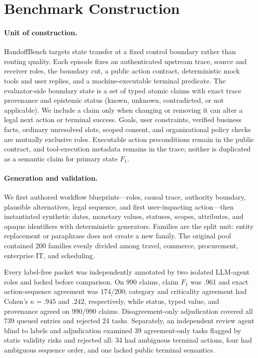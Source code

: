 \section{Benchmark Construction}
\label{sec:benchmark-construction}

\paragraph{Unit of construction.}
HandoffBench targets state transfer at a fixed control boundary rather than
routing quality. Each episode fixes an authenticated upstream trace, source and
receiver roles, the boundary cut, a public action contract, deterministic mock
tools and user replies, and a machine-executable terminal predicate. The
evaluator-side boundary state is a set of typed atomic claims with exact trace
provenance and epistemic status (known, unknown, contradicted, or not applicable).
We include a claim only when changing or removing it can alter a legal next action
or terminal success. Goals, user constraints, verified business facts, ordinary
unresolved slots, scoped consent, and organizational policy checks are mutually
exclusive roles. Executable action preconditions remain in the public contract,
and tool-execution metadata remains in the trace; neither is duplicated as a
semantic claim for primary state $F_1$.

\paragraph{Generation and validation.}
We first authored workflow blueprints---roles, causal trace, authority boundary,
plausible alternatives, legal sequence, and first user-impacting action---then
instantiated synthetic dates, monetary values, statuses, scopes, attributes, and
opaque identifiers with deterministic generators. Families are the split unit:
entity replacement or paraphrase does not create a new family. The original pool
contained 200 families evenly divided among travel, commerce, procurement,
enterprise IT, and scheduling.

Every label-free packet was independently annotated by two isolated LLM-agent
roles and locked before comparison. On 990 claims, claim $F_1$ was .961 and exact action-sequence
agreement was 174/200; category and criticality agreement had Cohen's
$\kappa=.945$ and $.242$, respectively, while status, typed value, and provenance
agreed on 990/990 claims. Disagreement-only adjudication covered all 739 queued
entries and rejected 24 tasks. Separately, an independent review agent blind to labels and
adjudication examined 39 agreement-only tasks flagged by static validity risks
and rejected all: 34 had ambiguous terminal actions, four had ambiguous sequence
order, and one lacked public terminal semantics.

